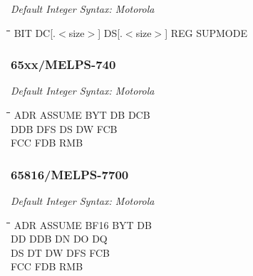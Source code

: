 {\em Default Integer Syntax: Motorola}

{\tt\begin{tabbing}
\hspace{3cm}\=\hspace{3cm}\=\hspace{3cm}\=\hspace{3cm}\=\kill
BIT        \> DC[.$<$size$>$]    \> DS[.$<$size$>$]   \> REG       \> SUPMODE \\
\end{tabbing}}

\subsubsection{65xx/MELPS-740}

{\em Default Integer Syntax: Motorola}

{\tt\begin{tabbing}
\hspace{3cm}\=\hspace{3cm}\=\hspace{3cm}\=\hspace{3cm}\=\kill
ADR        \> ASSUME      \> BYT         \> DB          \> DCB \\
DDB        \> DFS         \> DS          \> DW          \> FCB \\
FCC        \> FDB         \> RMB \\
\end{tabbing}}

\subsubsection{65816/MELPS-7700}

{\em Default Integer Syntax: Motorola}

{\tt\begin{tabbing}
\hspace{3cm}\=\hspace{3cm}\=\hspace{3cm}\=\hspace{3cm}\=\kill
ADR        \> ASSUME      \> BF16        \> BYT         \> DB \\
DD         \> DDB         \> DN          \> DO          \> DQ \\
DS         \> DT          \> DW          \> DFS         \> FCB \\
FCC        \> FDB         \> RMB \\
\end{tabbing}}

